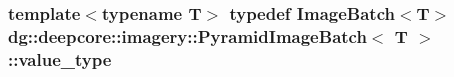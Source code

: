 \subsubsection[{\texorpdfstring{value\+\_\+type}{value_type}}]{\setlength{\rightskip}{0pt plus 5cm}template$<$typename T$>$ typedef {\bf Image\+Batch}$<$T$>$ {\bf dg\+::deepcore\+::imagery\+::\+Pyramid\+Image\+Batch}$<$ T $>$\+::{\bf value\+\_\+type}}\hypertarget{classdg_1_1deepcore_1_1imagery_1_1_pyramid_image_batch_a64329b050ba9864aec3e3532c7a2aad3}{}\label{classdg_1_1deepcore_1_1imagery_1_1_pyramid_image_batch_a64329b050ba9864aec3e3532c7a2aad3}
